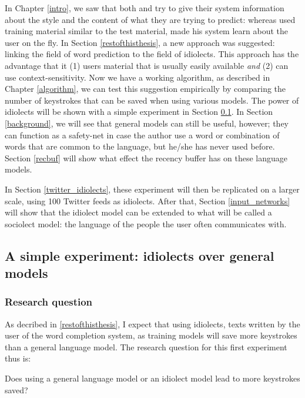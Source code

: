\documentclass[11pt]{article}
\begin{document}
In Chapter \ref{intro}, we saw that both  and  try to give their system information about the style and the content of what they are trying to predict: whereas  used training material similar to the test material,  made his system learn about the user on the fly. In Section \ref{restofthisthesis}, a new approach was suggested: linking the field of word prediction to the field of idiolects. This approach has the advantage that it (1) users material that is usually easily available \emph{and} (2) can use context-sensitivity. Now we have a working algorithm, as described in Chapter \ref{algorithm}, we can test this suggestion empirically by comparing the number of keystrokes that can be saved when using various models. The power of idiolects will be shown with a simple experiment in Section \ref{simple_exp}. In Section \ref{background}, we will see that general models can still be useful, however; they can function as a safety-net in case the author use a word or combination of words that are common to the language, but he/she has never used before. Section \ref{recbuf} will show what effect the recency buffer has on these language models.

In Section \ref{twitter_idiolects}, these experiment will then be replicated on a larger scale, using 100 Twitter feeds as idiolects. After that, Section \ref{input_networks} will show that the idiolect model can be extended to what will be called a sociolect model: the language of the people the user often communicates with.

\subsection{A simple experiment: idiolects over general models} \label{simple_exp}

\subsubsection{Research question}
As decribed in \ref{restofthisthesis}, I expect that using idiolects, texts written by the user of the word completion system, as training models will save more keystrokes than a general language model. The research question for this first experiment thus is:

\begin{examples}

\item Does using a general language model or an idiolect model lead to more keystrokes saved?

\end{examples}
\end{document}
